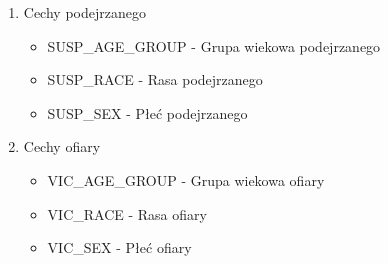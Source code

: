 \documentclass{classrep}
\begin{document}
{{\begin{enumerate}
\begin{itemize}
                    \item X\_COORD\_CD - Współrzędna X dla układu współrzędnych płaszczyzny stanu Nowy Jork, strefa Long Island, NAD 83, jednostki w stopach (FIPS 3104)
                    \item Y\_COORD\_CD - Współrzędna Y dla układu współrzędnych płaszczyzny stanu Nowy Jork, strefa Long Island, NAD 83, jednostki w stopach (FIPS 3104)
                    \item TRANSIT\_DISTRICT - Okręg tranzytowy, w którym doszło do wykroczenia.
                    \item Latitude - Współrzędna szerokości geograficznej środkowego bloku dla globalnego układu współrzędnych, WGS 1984, stopnie dziesiętne (EPSG 4326)
                    \item Longitude - Współrzędna długości bloku środkowego dla globalnego układu współrzędnych, WGS 1984, stopnie dziesiętne (EPSG 4326)
                    \item Lat\_Lon - Punkt lokalizacji geoprzestrzennej (łącznie szerokość i długość geograficzna)
                    \item PATROL\_BORO - Nazwa dzielnicy patrolowej, w której doszło do incydentu
                    \item STATION\_NAME - Nazwa stacji tranzytowej
                \end{itemize}
                \item Cechy podejrzanego
                \begin{itemize}
                    \item SUSP\_AGE\_GROUP - Grupa wiekowa podejrzanego
                    \item SUSP\_RACE - Rasa podejrzanego
                    \item SUSP\_SEX - Płeć podejrzanego
                \end{itemize}
                \item Cechy ofiary
                \begin{itemize}
                    \item VIC\_AGE\_GROUP - Grupa wiekowa ofiary
                    \item VIC\_RACE - Rasa ofiary
                    \item VIC\_SEX - Płeć ofiary
                \end{itemize}
            \end{enumerate}
        }
        
}
\end{document}
